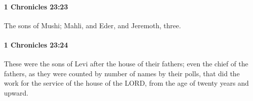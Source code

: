 		\paragraph{1 Chronicles 23:23} %
			\label{1CHRONICLES-23-23}

			The sons of Mushi; Mahli, and Eder, and Jeremoth, three.


		\paragraph{1 Chronicles 23:24} %
			\label{1CHRONICLES-23-24}

			These were the sons of Levi after the house of their fathers; even the chief of the fathers, as they were counted by number of names by their polls, that did the work for the service of the house of the LORD, from the age of twenty years and upward.


